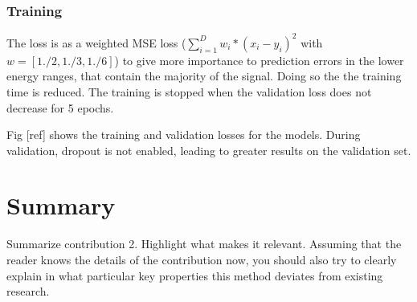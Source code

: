 \subsubsection{Training}
The loss is as a weighted MSE loss ($\sum_{i=1}^{D}w_i*(x_i-y_i)^2$ with $w=[1./2, 1./3, 1./6]$) to give more importance to prediction errors in the lower energy ranges, that contain the majority of the signal. Doing so the the training time is reduced. The training is stopped when the validation loss does not decrease for 5 epochs. 


Fig [ref] shows the training and validation losses for the models. During validation, dropout is not enabled, leading to greater results on the validation set. 





\section{Summary}
\label{s:Contribution-2-Summary}

Summarize contribution 2. Highlight what makes it relevant. Assuming that the reader knows the details of the contribution now, you should also try to clearly explain in what particular key properties this method deviates from existing research.
